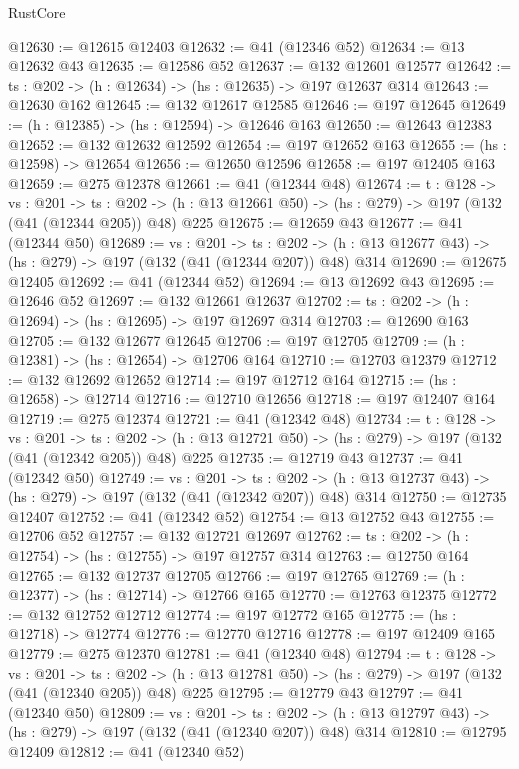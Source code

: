 \begin{lexlean}{RustCore}
\begin{coremodule}
@12630 := @12615 @12403
@12632 := @41 (@12346 @52)
@12634 := @13 @12632 @43
@12635 := @12586 @52
@12637 := @132 @12601 @12577
@12642 := {ts : @202} -> (h : @12634) -> (hs : @12635) -> @197 @12637 @314
@12643 := @12630 @162
@12645 := @132 @12617 @12585
@12646 := @197 @12645
@12649 := (h : @12385) -> (hs : @12594) -> @12646 @163
@12650 := @12643 @12383
@12652 := @132 @12632 @12592
@12654 := @197 @12652 @163
@12655 := (hs : @12598) -> @12654
@12656 := @12650 @12596
@12658 := @197 @12405 @163
@12659 := @275 @12378
@12661 := @41 (@12344 @48)
@12674 := {t : @128} ->
  {vs : @201} ->
  {ts : @202} -> (h : @13 @12661 @50) -> (hs : @279) -> @197 (@132 (@41 (@12344 @205)) @48) @225
@12675 := @12659 @43
@12677 := @41 (@12344 @50)
@12689 := {vs : @201} ->
  {ts : @202} -> (h : @13 @12677 @43) -> (hs : @279) -> @197 (@132 (@41 (@12344 @207)) @48) @314
@12690 := @12675 @12405
@12692 := @41 (@12344 @52)
@12694 := @13 @12692 @43
@12695 := @12646 @52
@12697 := @132 @12661 @12637
@12702 := {ts : @202} -> (h : @12694) -> (hs : @12695) -> @197 @12697 @314
@12703 := @12690 @163
@12705 := @132 @12677 @12645
@12706 := @197 @12705
@12709 := (h : @12381) -> (hs : @12654) -> @12706 @164
@12710 := @12703 @12379
@12712 := @132 @12692 @12652
@12714 := @197 @12712 @164
@12715 := (hs : @12658) -> @12714
@12716 := @12710 @12656
@12718 := @197 @12407 @164
@12719 := @275 @12374
@12721 := @41 (@12342 @48)
@12734 := {t : @128} ->
  {vs : @201} ->
  {ts : @202} -> (h : @13 @12721 @50) -> (hs : @279) -> @197 (@132 (@41 (@12342 @205)) @48) @225
@12735 := @12719 @43
@12737 := @41 (@12342 @50)
@12749 := {vs : @201} ->
  {ts : @202} -> (h : @13 @12737 @43) -> (hs : @279) -> @197 (@132 (@41 (@12342 @207)) @48) @314
@12750 := @12735 @12407
@12752 := @41 (@12342 @52)
@12754 := @13 @12752 @43
@12755 := @12706 @52
@12757 := @132 @12721 @12697
@12762 := {ts : @202} -> (h : @12754) -> (hs : @12755) -> @197 @12757 @314
@12763 := @12750 @164
@12765 := @132 @12737 @12705
@12766 := @197 @12765
@12769 := (h : @12377) -> (hs : @12714) -> @12766 @165
@12770 := @12763 @12375
@12772 := @132 @12752 @12712
@12774 := @197 @12772 @165
@12775 := (hs : @12718) -> @12774
@12776 := @12770 @12716
@12778 := @197 @12409 @165
@12779 := @275 @12370
@12781 := @41 (@12340 @48)
@12794 := {t : @128} ->
  {vs : @201} ->
  {ts : @202} -> (h : @13 @12781 @50) -> (hs : @279) -> @197 (@132 (@41 (@12340 @205)) @48) @225
@12795 := @12779 @43
@12797 := @41 (@12340 @50)
@12809 := {vs : @201} ->
  {ts : @202} -> (h : @13 @12797 @43) -> (hs : @279) -> @197 (@132 (@41 (@12340 @207)) @48) @314
@12810 := @12795 @12409
@12812 := @41 (@12340 @52)

\end{coremodule}
\end{lexlean}

